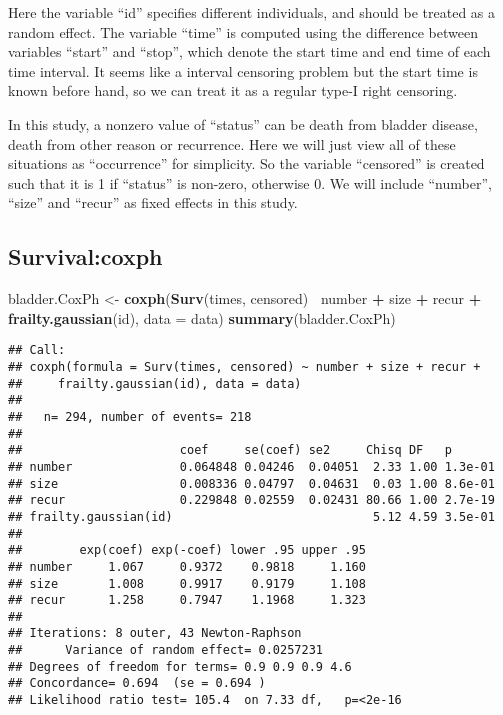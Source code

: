 \documentclass[]{article}
\newenvironment{Shaded}{\begin{snugshade}}{\end{snugshade}}
\newcommand{\DataTypeTok}[1]{\textcolor[rgb]{0.13,0.29,0.53}{#1}}
\newcommand{\KeywordTok}[1]{\textcolor[rgb]{0.13,0.29,0.53}{\textbf{#1}}}
\newcommand{\NormalTok}[1]{#1}
\newcommand{\OperatorTok}[1]{\textcolor[rgb]{0.81,0.36,0.00}{\textbf{#1}}}
\newcommand{\StringTok}[1]{\textcolor[rgb]{0.31,0.60,0.02}{#1}}
\begin{document}
Here the variable ``id'' specifies different individuals, and should be
treated as a random effect. The variable ``time'' is computed using the
difference between variables ``start'' and ``stop'', which denote the
start time and end time of each time interval. It seems like a interval
censoring problem but the start time is known before hand, so we can
treat it as a regular type-I right censoring.

In this study, a nonzero value of ``status'' can be death from bladder
disease, death from other reason or recurrence. Here we will just view
all of these situations as ``occurrence'' for simplicity. So the
variable ``censored'' is created such that it is 1 if ``status'' is
non-zero, otherwise 0. We will include ``number'', ``size'' and
``recur'' as fixed effects in this study.

\hypertarget{survivalcoxph}{%
\subsection{Survival:coxph}\label{survivalcoxph}}

\begin{Shaded}
\begin{Highlighting}[]
\NormalTok{bladder.CoxPh <-}\StringTok{ }\KeywordTok{coxph}\NormalTok{(}\KeywordTok{Surv}\NormalTok{(times, censored)}\OperatorTok{~}\StringTok{ }\NormalTok{number }\OperatorTok{+}\StringTok{ }\NormalTok{size }\OperatorTok{+}\StringTok{ }\NormalTok{recur }\OperatorTok{+}\StringTok{ }\KeywordTok{frailty.gaussian}\NormalTok{(id), }\DataTypeTok{data =}\NormalTok{ data)}
\KeywordTok{summary}\NormalTok{(bladder.CoxPh)}
\end{Highlighting}
\end{Shaded}

\begin{verbatim}
## Call:
## coxph(formula = Surv(times, censored) ~ number + size + recur + 
##     frailty.gaussian(id), data = data)
## 
##   n= 294, number of events= 218 
## 
##                      coef     se(coef) se2     Chisq DF   p      
## number               0.064848 0.04246  0.04051  2.33 1.00 1.3e-01
## size                 0.008336 0.04797  0.04631  0.03 1.00 8.6e-01
## recur                0.229848 0.02559  0.02431 80.66 1.00 2.7e-19
## frailty.gaussian(id)                            5.12 4.59 3.5e-01
## 
##        exp(coef) exp(-coef) lower .95 upper .95
## number     1.067     0.9372    0.9818     1.160
## size       1.008     0.9917    0.9179     1.108
## recur      1.258     0.7947    1.1968     1.323
## 
## Iterations: 8 outer, 43 Newton-Raphson
##      Variance of random effect= 0.0257231 
## Degrees of freedom for terms= 0.9 0.9 0.9 4.6 
## Concordance= 0.694  (se = 0.694 )
## Likelihood ratio test= 105.4  on 7.33 df,   p=<2e-16
\end{verbatim}
\end{document}
